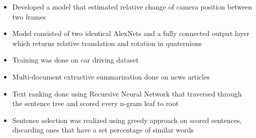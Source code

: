 \documentclass[10pt,a4paper]{source/altacv}
\begin{document}






\begin{itemize}
    \item \small{Developed a model that estimated relative change of camera position between two frames}
    \item \small{Model consisted of two identical AlexNets and a fully connected output layer which returns relative translation and rotation in quaternions}
    \item \small{Training was done on car driving dataset}
    \\
    \smallskip
    \smallskip
      
\end{itemize}
    
\divider



\begin{itemize}
  \item \small{Multi-document extractive summarization done on news articles}
  \item \small{Text ranking done using Recursive Neural Network that traversed through the sentence tree and scored every n-gram leaf to root}
  \item \small{Sentence selection was realized using greedy approach on scored sentences, discarding ones that have a set percentage of similar words}
  \\
  \smallskip
  \smallskip
    
\end{itemize}
\end{document}
